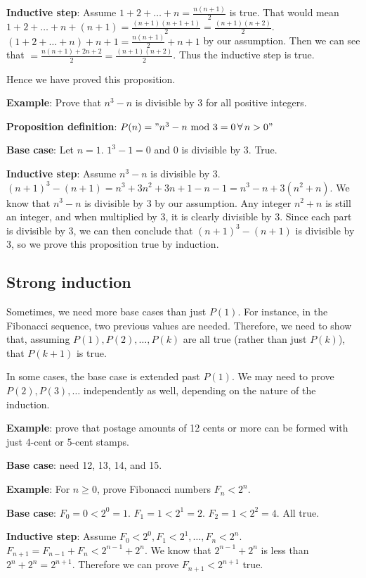 \documentclass{article}
\begin{document}
\textbf{Inductive step}: Assume $1 + 2 + \dots + n = \frac{n(n + 1)}{2}$ is true. That would mean $1 + 2 + \dots + n + (n + 1) = \frac{(n + 1)(n + 1 + 1)}{2} = \frac{(n + 1)(n + 2)}{2}$. $(1 + 2 + \dots + n) + n + 1 = \frac{n(n + 1)}{2} + n + 1$ by our assumption. Then we can see that $= \frac{n(n + 1) + 2n + 2}{2} = \frac{(n + 1)(n + 2)}{2}$. Thus the inductive step is true.

Hence we have proved this proposition.

\textbf{Example}: Prove that $n^3 - n$ is divisible by 3 for all positive integers.

\textbf{Proposition definition}: $P(n) = "n^3 - n\text{ mod }3 = 0 \,\forall\, n > 0"$

\textbf{Base case}: Let $n = 1$. $1^3 - 1 = 0$ and $0$ is divisible by $3$. True.

\textbf{Inductive step}: Assume $n^3 - n$ is divisible by $3$. $(n + 1)^3 - (n + 1) = n^3 + 3n^2 + 3n + 1 - n - 1 = n^3 - n + 3(n^2 + n)$. We know that $n^3 - n$ is divisible by $3$ by our assumption. Any integer $n^2 + n$ is still an integer, and when multiplied by $3$, it is clearly divisible by $3$. Since each part is divisible by $3$, we can then conclude that $(n + 1)^3 - (n + 1)$ is divisible by $3$, so we prove this proposition true by induction.

\subsection{Strong induction}
Sometimes, we need more base cases than just $P(1)$. For instance, in the Fibonacci sequence, two previous values are needed. Therefore, we need to show that, assuming $P(1), P(2), \dots, P(k)$ are all true (rather than just $P(k)$), that $P(k + 1)$ is true.

In some cases, the base case is extended past $P(1)$. We may need to prove $P(2), P(3), \dots$ independently as well, depending on the nature of the induction.

\textbf{Example}: prove that postage amounts of 12 cents or more can be formed with just 4-cent or 5-cent stamps.

\textbf{Base case}: need 12, 13, 14, and 15.

\textbf{Example}: For $n \geq 0$, prove Fibonacci numbers $F_n < 2^n$.

\textbf{Base case}: $F_0 = 0 < 2^0 = 1$. $F_1 = 1 < 2^1 = 2$. $F_2 = 1 < 2^2 = 4$. All true.

\textbf{Inductive step}: Assume $F_0 < 2^0, F_1 < 2^1, \dots, F_n < 2^n$. $F_{n + 1} = F_{n - 1} + F_{n} < 2^{n - 1} + 2^n$. We know that $2^{n - 1} + 2^n$ is less than $2^n + 2^n = 2^{n + 1}$. Therefore we can prove $F_{n + 1} < 2^{n + 1}$ true.
\end{document}
